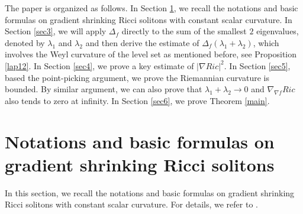 \documentclass[12pt]{amsart}
\begin{document}
	\smallskip

	The paper is organized as follows.
	In Section \ref{sec2}, we recall the notations and basic formulas on gradient shrinking Ricci solitons with constant scalar curvature.
	In Section \ref{sec3}, we will apply $\Delta_f$ directly to the sum of the smallest $2$ eigenvalues, denoted by $\lambda_1$ and $\lambda_2$ and then derive the estimate of $\Delta_f(\lambda_1+\lambda_2)$,  which involves the Weyl curvature of the level set as mentioned before, see Proposition \ref{lap12}.
	In Section \ref{sec4}, we prove a key estimate of $|\nabla Ric|^2$.
	In Section \ref{sec5}, based the point-picking argument, we prove the Riemannian curvature is bounded. By similar argument, we can also prove that $\lambda_1+\lambda_2 \rightarrow 0$ and $\nabla_{\nabla f}Ric$ also tends to zero at infinity.
	In Section \ref{sec6}, we prove Theorem \ref{main}.
	
	\smallskip
	
	
	
	\section{Notations and basic formulas on gradient shrinking Ricci solitons}\label{sec2}
	
	In this section, we recall the notations and basic formulas on gradient shrinking Ricci solitons with constant scalar curvature. For details, we refer to \cite{Cao,Hamilton,Petersen-Wylie,Cheng-Zhou}.
	
\end{document}
